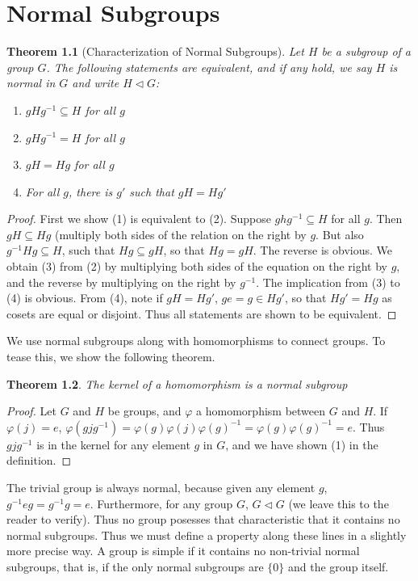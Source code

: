 \documentclass[12pt]{report}
\newtheorem{theorem}{Theorem}[section]
\begin{document}
\chapter{Normal Subgroups}

\begin{theorem}[Characterization of Normal Subgroups]
Let $H$ be a subgroup of a group $G$. The following statements are equivalent, and if any hold, we say $H$ is normal in $G$ and write $H \lhd G$:
\begin{enumerate}
    \item $gHg^{-1} \subseteq H$ for all $g$
    \item $gHg^{-1} = H$ for all $g$
    \item $gH = Hg$ for all $g$
    \item For all $g$, there is $g'$ such that $gH = Hg'$
\end{enumerate}
\end{theorem}
\begin{proof}
    First we show (1) is equivalent to (2). Suppose $ghg^{-1} \subseteq H$ for all $g$. Then $gH \subseteq Hg$ (multiply both sides of the relation on the right by $g$. But also $g^{-1}Hg \subseteq H$, such that $Hg \subseteq gH$, so that $Hg = gH$. The reverse is obvious. We obtain (3) from (2) by multiplying both sides of the equation on the right by $g$, and the reverse by multiplying on the right by $g^{-1}$. The implication from (3) to (4) is obvious. From (4), note if $gH = Hg'$, $ge = g \in Hg'$, so that $Hg' = Hg$ as cosets are equal or disjoint. Thus all statements are shown to be equivalent.
\end{proof}

We use normal subgroups along with homomorphisms to connect groups. To tease this, we show the following theorem.
\begin{theorem} The kernel of a homomorphism is a normal subgroup \end{theorem}
\begin{proof} Let $G$ and $H$ be groups, and $\varphi$ a homomorphism between $G$ and $H$. If $\varphi(j)=e$, $\varphi(gjg^{-1}) = \varphi(g)\varphi(j)\varphi(g)^{-1} = \varphi(g)\varphi(g)^{-1} = e$. Thus $gjg^{-1}$ is in the kernel for any element $g$ in $G$, and we have shown (1) in the definition. \end{proof}

The trivial group is always normal, because given any element $g$, $g^{-1}eg = g^{-1}g = e$. Furthermore, for any group $G$, $G \lhd G$ (we leave this to the reader to verify). Thus no group posesses that characteristic that it contains no normal subgroups. Thus we must define a property along these lines in a slightly more precise way. A group is simple if it contains no non-trivial normal subgroups, that is, if the only normal subgroups are $\{ 0 \}$ and the group itself.
\end{document}
